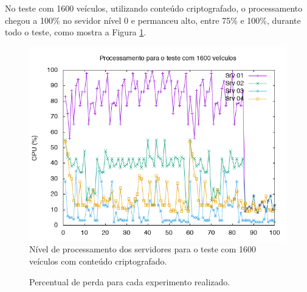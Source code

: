 \documentclass[
	12pt,				%
	oneside,			%
	a4paper,			%
	english,			%
	brazil				%
	]{abntex2ppgsi}
\begin{document}
No teste com 1600 veículos, utilizando conteúdo criptografado, o processamento chegou a 100\% no sevidor nível 0 e permanceu alto, entre 75\% e 100\%, durante todo o teste, como mostra a Figura \ref{fig:processamento1600}.

\begin{figure}[h!]
	\centering
	\includegraphics[width=0.7\columnwidth]{images/processamento2.png}
	\caption{Nível de processamento dos servidores para o teste com 1600 veículos com conteúdo criptografado.}
	\label{fig:processamento1600}
\end{figure}


\begin{figure}[ht!]
	\caption{Percentual de perda para cada experimento realizado.}
	\centering
	\label{fig:graficoperda}
\end{figure}  
\end{document}
